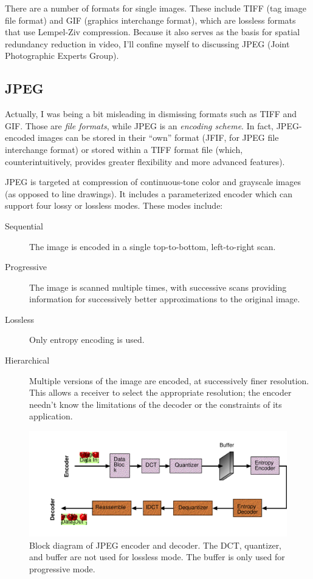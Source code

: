 There are a number of formats for single images. These include TIFF
(tag image file format) and GIF (graphics interchange format), which
are lossless formats that use Lempel-Ziv compression. Because it also
serves as the basis for spatial redundancy reduction in video, I'll
confine myself to discussing JPEG (Joint Photographic Experts Group).

\subsection{JPEG}

Actually, I was being a bit misleading in dismissing formats such as
TIFF and GIF. Those are \emph{file formats}, while JPEG is an
\emph{encoding scheme}. In fact, JPEG-encoded images can be stored in
their ``own'' format (JFIF, for JPEG file interchange format) or
stored within a TIFF format file (which, counterintuitively, provides
greater flexibility and more advanced features).

JPEG is targeted at compression of continuous-tone color and grayscale
images (as opposed to line drawings). It includes a parameterized
encoder which can support four lossy or lossless modes. These modes
include:
\begin{description}
\item[Sequential] The image is encoded in a single top-to-bottom,
left-to-right scan.
\item[Progressive] The image is scanned multiple times, with
successive scans providing information for successively better
approximations to the original image.
\item[Lossless] Only entropy encoding is used.
\item[Hierarchical] Multiple versions of the image are encoded, at
successively finer resolution. This allows a receiver to select the
appropriate resolution; the encoder needn't know the limitations of
the decoder or the constraints of its application.
\end{description}

\begin{figure}
\centerline{\includegraphics[width=\textwidth]{ch-av/fig9-1}}
\caption[Block diagram of JPEG encoder and decoder]{Block diagram of
JPEG encoder and decoder. The DCT, quantizer, and buffer are not used
for lossless mode. The buffer is only used for progressive
mode.\label{fg:jpeg}}
\end{figure}

